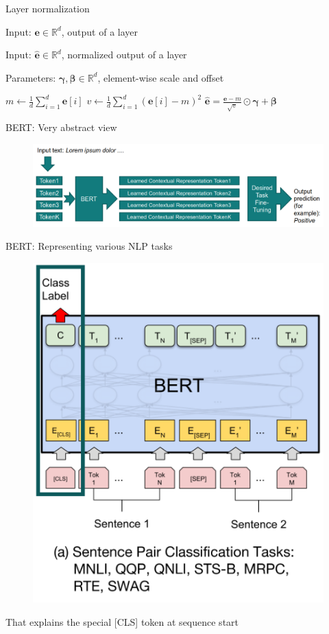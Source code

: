 \documentclass[12pt,aspectratio=169,handout]{beamer}
\begin{document}
\begin{frame}{Layer normalization}
	
	Input: $\bm{e} \in \mathbb{R}^{d}$, output of a layer
	
	Input: $\bm{\hat e} \in \mathbb{R}^{d}$, normalized output of a layer
	
	Parameters: $\bm{\gamma}, \bm{\beta} \in \mathbb{R}^{d}$, element-wise scale and offset
	
	\begin{algorithmic}[1]
		\State $m \gets \frac{1}{d} \sum_{i = 1}^{d} \bm{e}[i]$
		\State $v \gets \frac{1}{d} \sum_{i = 1}^{d} (\bm{e}[i] - m)^2$
		\State \Return $\bm{\hat e} = \frac{\bm{e} - m}{\sqrt{v}} \odot \bm{\gamma} + \bm{\beta}$
		\EndFunction
	\end{algorithmic}	
	
\end{frame}




\begin{frame}{BERT: Very abstract view}
	
	\begin{figure}
		\includegraphics[width=\linewidth]{img/bert1.png}
	\end{figure}	
	
\end{frame}


\begin{frame}{BERT: Representing various NLP tasks}
	
	\begin{figure}
		\includegraphics[width=0.5\linewidth]{img/task1.png}
	\end{figure}
	
	That explains the special [CLS] token at sequence start
	
\end{frame}
\end{document}
